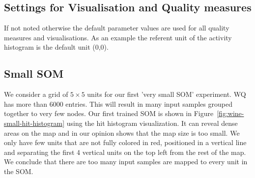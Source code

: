 \documentclass{acm_proc_article-sp}
\begin{document}
\subsection{Settings for Visualisation and Quality measures}

If not noted otherwise the default parameter values are used for all quality measures and visualisations.
As an example the referent unit of the activity histogram is the default unit (0,0).

\subsection{Small SOM}

We consider a grid of $5\times5$ units for our first 'very small SOM' experiment. WQ has more than 6000 entries.
This will result in many input samples grouped together to very few nodes. Our first trained
SOM is shown in Figure~\ref{fig:wine-small-hit-histogram} using the hit histogram visualization.
It can reveal dense areas on the map and in our opinion shows that the map size is too small.
We only have few units that are not fully colored in red, positioned in a vertical line and separating
the first 4 vertical units on the top left from the rest of the map. We conclude that there are
too many input samples are mapped to every unit in the SOM.
\end{document}
